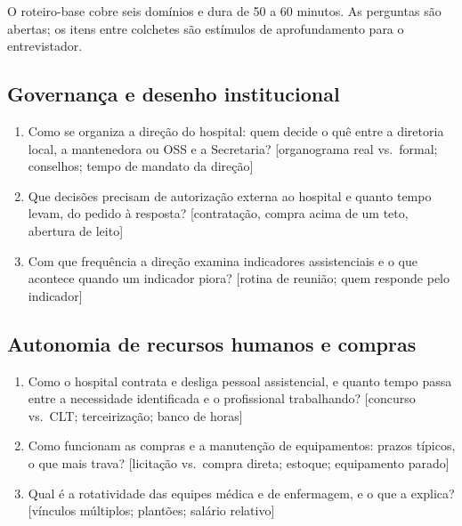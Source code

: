 \documentclass[12pt,a4paper]{article}
\newcommand{\achado}[1]{%
  \noindent{\small\itshape\textcolor{black!60}{Achado que a pergunta
  testa: #1}}\par\smallskip}
\begin{document}
O roteiro-base cobre seis domínios e dura de 50 a 60 minutos. As perguntas são abertas; os itens entre colchetes são estímulos de aprofundamento para o entrevistador.

\subsection{Governança e desenho institucional}
\begin{enumerate}[itemsep=2pt]
  \item Como se organiza a direção do hospital: quem decide o quê entre a diretoria local, a mantenedora ou OSS e a Secretaria? [organograma real vs.\ formal; conselhos; tempo de mandato da direção]
  \par\nopagebreak\achado{a eficiência técnica maior das OSS é traço robusto da rede (DEA e SFA concordam); a hipótese é que o desenho de governança seja o canal.}
  \item Que decisões precisam de autorização externa ao hospital e quanto tempo levam, do pedido à resposta? [contratação, compra acima de um teto, abertura de leito]
  \par\nopagebreak\achado{o regime operacional mais intenso das OSS sugere menor fricção decisória; a pergunta mede a fricção diretamente.}
  \item Com que frequência a direção examina indicadores assistenciais e o que acontece quando um indicador piora? [rotina de reunião; quem responde pelo indicador]
  \par\nopagebreak\achado{desviantes positivos mantêm eficiência alta por 11 anos; persistência sugere rotina gerencial, não sorte.}
\end{enumerate}

\subsection{Autonomia de recursos humanos e compras}
\begin{enumerate}[itemsep=2pt]
  \item Como o hospital contrata e desliga pessoal assistencial, e quanto tempo passa entre a necessidade identificada e o profissional trabalhando? [concurso vs.\ CLT; terceirização; banco de horas]
  \par\nopagebreak\achado{a produção das OSS é cerca de 45\% maior a estrutura comparável; elasticidade de RH é o mecanismo candidato.}
  \item Como funcionam as compras e a manutenção de equipamentos: prazos típicos, o que mais trava? [licitação vs.\ compra direta; estoque; equipamento parado]
  \par\nopagebreak\achado{o faturamento real por saída não difere entre categorias; se as OSS produzem mais com faturamento igual, a diferença deve estar no uso dos insumos, não no preço.}
  \item Qual é a rotatividade das equipes médica e de enfermagem, e o que a explica? [vínculos múltiplos; plantões; salário relativo]
  \par\nopagebreak\achado{estabilidade de equipe é explicação concorrente à gestão para a eficiência persistente dos desviantes positivos.}
\end{enumerate}
\end{document}
